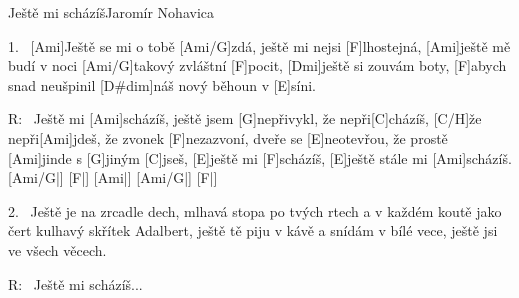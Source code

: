 \begin{song}{Ještě mi scházíš}{Jaromír Nohavica}

\begin{xverse}{1.~}
[\large Ami]Ještě se mi o tobě [\large Ami/G]zdá, ještě mi nejsi [\large F]lhostejná,
[\large Ami]ještě mě budí v noci [\large Ami/G]takový zvláštní [\large F]pocit,
[\large Dmi]ještě si zouvám boty, [\large F]abych snad neušpinil
[\large D#dim]náš nový běhoun v [\large E]síni.
\end{xverse}

\begin{xverse}{R:~}
Ještě mi [\large Ami]scházíš, ještě jsem [\large G]nepřivykl,
že nepři[\large C]cházíš, [\large C/H]{že} nepři[\large Ami]jdeš,
že zvonek [\large F]nezazvoní, dveře se [\large E]neotevřou,
že prostě [\large Ami]jinde s [\large G]jiným [\large C]jseš,
[\large E]ještě mi [\large F]scházíš, [\large E]ještě stále mi [\large Ami]scházíš.  [\large Ami/G|]{} [\large F|]{} [\large Ami|]{} [\large Ami/G|]{} [\large F|]{}
\end{xverse}

\begin{xverse}{2.~}
Ještě je na zrcadle dech, mlhavá stopa po tvých rtech
a v každém koutě jako čert kulhavý skřítek Adalbert,
ještě tě piju v kávě a snídám v bílé vece,
ještě jsi ve všech věcech.
\end{xverse}

\begin{xverse}{R:~}
Ještě mi scházíš...
\end{xverse}

\end{song}




